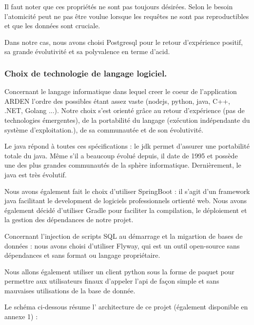 Il faut noter que ces propriétés ne sont pas toujours désirées. Selon le besoin l'atomicité peut ne pas être voulue lorsque les requêtes ne sont pas reproductibles et que les données sont cruciale.

Dans notre cas, nous avons choisi Postgresql pour le retour d'expérience positif, sa grande évolutivité et sa polyvalence en terme d'\gls{acid}.

\subsubsection{Choix de technologie de langage logiciel.}

Concernant le langage informatique dans lequel creer le coeur de l'application ARDEN l'ordre des possibles étant assez vaste (nodejs, python, java, C++, .NET, Golang ...). Notre choix s'est orienté grâce au retour d'expérience (pas de technologies émergentes), de la portabilité du langage (exécution indépendante du système d'exploitation.), de sa communautée et de son évolutivité.

Le java répond à toutes ces spécifications : 
le \gls{jdk} permet d'assurer une portabilité totale du java. Même s'il a beaucoup évolué depuis, il date de 1995 et possède une des plus grandes communautés de la sphère informatique. Dernièrement, le java est très évolutif. 

Nous avons également fait le choix d'utiliser SpringBoot : il s'agit d'un framework java facilitant le development de logiciels professionnels ortienté web.
Nous avons également décidé d'utiliser Gradle pour faciliter la compilation, le déploiement et la gestion des dépendances de notre projet.

Concernant l'injection de scripts SQL au démarrage et la migartion de bases de données : nous avons choisi d'utiliser Flyway, qui est un outil open-source sans dépendances et sans format ou langage propriétaire.

Nous allons également utiliser un client python sous la forme de paquet pour permettre aux utilisateurs finaux d'appeler l'api de façon simple et sans mauvaises utilisations de la base de donnée.

Le schéma ci-dessous résume l' architecture de ce projet (également disponible en annexe 1) : 


